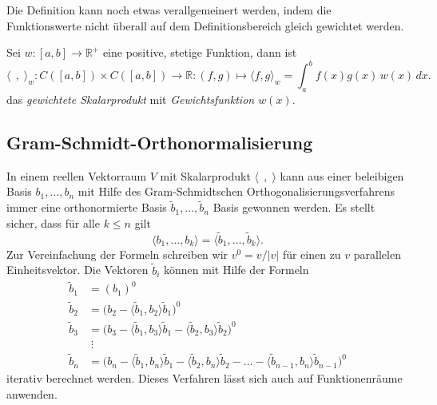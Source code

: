Die Definition kann noch etwas verallgemeinert werden, indem 
die Funktionswerte nicht überall auf dem Definitionsbereich 
gleich gewichtet werden. 

\begin{definition}
\label{buch:orthogonal:def:skalarproduktw}
Sei $w\colon [a,b]\to \mathbb{R}^+$ eine positive, stetige Funktion,
dann ist
\[
\langle\;\,,\;\rangle_w
\colon
C([a,b]) \times C([a,b]) \to \mathbb{R}
:
(f,g) \mapsto \langle f,g\rangle_w = \int_a^b f(x)g(x)\,w(x)\,dx.
\]
das {\em gewichtete Skalarprodukt} mit {\em Gewichtsfunktion $w(x)$}.
\end{definition}

\subsection{Gram-Schmidt-Orthonormalisierung}
In einem reellen Vektorraum $V$ mit Skalarprodukt $\langle\;\,,\;\rangle$
kann aus einer beleibigen Basis $b_1,\dots,b_n$ mit Hilfe des 
Gram-Schmidtschen Orthogonalisierungsverfahrens immer eine
orthonormierte Basis $\tilde{b}_1,\dots,\tilde{b}_n$ Basis
gewonnen werden.
Es stellt sicher, dass für alle $k\le n$ gilt
\[
\langle b_1,\dots,b_k\rangle
=
\langle \tilde{b}_1,\dots,\tilde{b}_k\rangle.
\]
Zur Vereinfachung der Formeln schreiben wir $v^0=v/|v|$ für einen zu
$v$ parallelen Einheitsvektor.
Die Vektoren $\tilde{b}_i$ können mit Hilfe der Formeln
\begin{align*}
\tilde{b}_1
&=
(b_1)^0
\\
\tilde{b}_2
&=
\bigl(
b_2
-
\langle \tilde{b}_1,b_2\rangle \tilde{b}_1
\bigr)^0
\\
\tilde{b}_3
&=
\bigl(
b_3
-
\langle \tilde{b}_1,b_3\rangle \tilde{b}_1
-
\langle \tilde{b}_2,b_3\rangle \tilde{b}_2
\bigr)^0
\\
&\;\vdots
\\
\tilde{b}_n
&=
\bigl(
b_n
-
\langle \tilde{b}_1,b_n\rangle \tilde{b}_1
-
\langle \tilde{b}_2,b_n\rangle \tilde{b}_2
-\dots
-
\langle \tilde{b}_{n-1},b_n\rangle \tilde{b}_{n-1}
\bigr)^0
\end{align*}
iterativ berechnet werden.
Dieses Verfahren lässt sich auch auf Funktionenräume anwenden.

